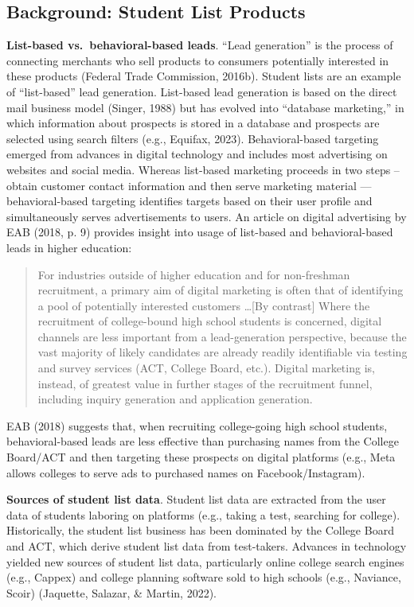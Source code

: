 \documentclass[
  12pt,
]{article}
\begin{document}
\hypertarget{background-student-list-products}{%
\subsection{Background: Student List Products}\label{background-student-list-products}}

\textbf{List-based vs.~behavioral-based leads}. ``Lead generation'' is the process of connecting merchants who sell products to consumers potentially interested in these products (Federal Trade Commission, 2016b). Student lists are an example of ``list-based'' lead generation. List-based lead generation is based on the direct mail business model (Singer, 1988) but has evolved into ``database marketing,'' in which information about prospects is stored in a database and prospects are selected using search filters (e.g., Equifax, 2023). Behavioral-based targeting emerged from advances in digital technology and includes most advertising on websites and social media. Whereas list-based marketing proceeds in two steps -- obtain customer contact information and then serve marketing material --- behavioral-based targeting identifies targets based on their user profile and simultaneously serves advertisements to users. An article on digital advertising by EAB (2018, p. 9) provides insight into usage of list-based and behavioral-based leads in higher education:

\begin{quote}
For industries outside of higher education and for non-freshman recruitment, a primary aim of digital marketing is often that of identifying a pool of potentially interested customers \ldots {[}By contrast{]} Where the recruitment of college-bound high school students is concerned, digital channels are less important from a lead-generation perspective, because the vast majority of likely candidates are already readily identifiable via testing and survey services (ACT, College Board, etc.). Digital marketing is, instead, of greatest value in further stages of the recruitment funnel, including inquiry generation and application generation.
\end{quote}

EAB (2018) suggests that, when recruiting college-going high school students, behavioral-based leads are less effective than purchasing names from the College Board/ACT and then targeting these prospects on digital platforms (e.g., Meta allows colleges to serve ads to purchased names on Facebook/Instagram).

\textbf{Sources of student list data}. Student list data are extracted from the user data of students laboring on platforms (e.g., taking a test, searching for college). Historically, the student list business has been dominated by the College Board and ACT, which derive student list data from test-takers. Advances in technology yielded new sources of student list data, particularly online college search engines (e.g., Cappex) and college planning software sold to high schools (e.g., Naviance, Scoir) (Jaquette, Salazar, \& Martin, 2022).
\end{document}
